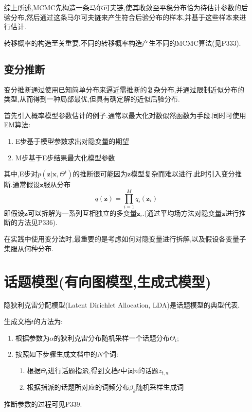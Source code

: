 综上所述,MCMC先构造一条马尔可夫链,使其收敛至平稳分布恰为待估计参数的后验分布,然后通过这条马尔可夫链来产生符合后验分布的样本,并基于这些样本来进行估计.

转移概率的构造至关重要,不同的转移概率构造产生不同的MCMC算法(见P333).

\subsection{变分推断}

变分推断通过使用已知简单分布来逼近需推断的复杂分布,并通过限制近似分布的类型,从而得到一种局部最优,但具有确定解的近似后验分布.

首先引入概率模型参数估计的例子.通常以最大化对数似然函数为手段.同时可使用EM算法:
\begin{enumerate}
\item E步基于模型参数求出对隐变量的期望
\item M步基于E步结果最大化模型参数
\end{enumerate}

其中,E步对$p(\mathbf z|\mathbf x, \Theta^t)$的推断很可能因为$\mathbf z$模型复杂而难以进行.此时引入变分推断.通常假设$\mathbf z$服从分布
\begin{equation}
q(\mathbf z)=\prod_{i=1}^Mq_i(\mathbf z_i)
\end{equation}
即假设$\mathbf z$可以拆解为一系列互相独立的多变量$\mathbf z_i$.(通过平均场方法对隐变量$\mathbf z$进行推断的方法见P336).

在实践中使用变分法时,最重要的是考虑如何对隐变量进行拆解,以及假设各变量子集服从何种分布.

\section{话题模型(有向图模型,生成式模型)}

隐狄利克雷分配模型(Latent Dirichlet Allocation, LDA)是话题模型的典型代表.

生成文档$t$的方法为:

\begin{enumerate}
\item 根据参数为$\alpha$的狄利克雷分布随机采样一个话题分布$\Theta_t$;
\item 按照如下步骤生成文档中的$N$个词:
    \begin{enumerate}
    \item 根据$\Theta_t$进行话题指派,得到文档$t$中词$n$的话题$z_{t,n}$
    \item 根据指派的话题所对应的词频分布$\beta_k$随机采样生成词
    \end{enumerate}
\end{enumerate}
推断参数的过程可见P339.
